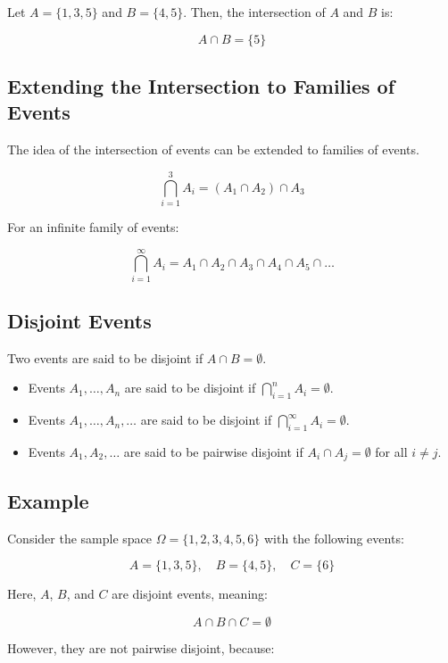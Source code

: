\documentclass{article}
\begin{document}
Let \(A = \{1, 3, 5\}\) and \(B = \{4, 5\}\). Then, the intersection of \(A\) and \(B\) is:

\[
A \cap B = \{5\}
\]

\subsection*{Extending the Intersection to Families of Events}

The idea of the intersection of events can be extended to families of events.

\[
\bigcap_{i=1}^{3} A_i = (A_1 \cap A_2) \cap A_3
\]

For an infinite family of events:

\[
\bigcap_{i=1}^{\infty} A_i = A_1 \cap A_2 \cap A_3 \cap A_4 \cap A_5 \cap \ldots
\]


\subsection*{Disjoint Events}

Two events are said to be disjoint if \(A \cap B = \emptyset\).

\begin{itemize}
    \item Events \(A_1, \ldots, A_n\) are said to be disjoint if \(\textstyle \bigcap_{i=1}^{n} A_i = \emptyset \).

    \item Events \(A_1, \ldots, A_n, \ldots\) are said to be disjoint if \(\textstyle \bigcap_{i=1}^{\infty} A_i = \emptyset \).
 
    \item Events \(A_1, A_2, \ldots\) are said to be pairwise disjoint if \(A_i \cap A_j = \emptyset\) for all \(i \neq j\).
\end{itemize}

\subsection*{Example}

Consider the sample space \(\Omega = \{1, 2, 3, 4, 5, 6\}\) with the following events:

\[
A = \{1, 3, 5\}, \quad B = \{4, 5\}, \quad C = \{6\}
\]

Here, \(A\), \(B\), and \(C\) are disjoint events, meaning:

\[
A \cap B \cap C = \emptyset
\]

However, they are not pairwise disjoint, because:
\end{document}
